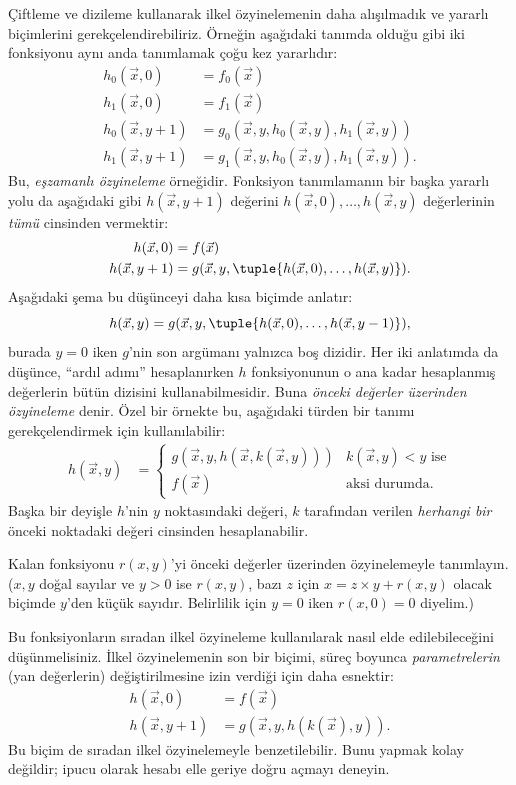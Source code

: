 \documentclass[../../../include/open-logic-section]{subfiles}
\begin{document}

Çiftleme ve dizileme kullanarak ilkel özyinelemenin daha alışılmadık ve
yararlı biçimlerini gerekçelendirebiliriz. Örneğin aşağıdaki tanımda olduğu
gibi iki fonksiyonu aynı anda tanımlamak çoğu kez yararlıdır:
\begin{align*}
  h_0(\vec x,0) & = f_0(\vec x)\\
  h_1(\vec x,0) & = f_1(\vec x)\\
  h_0(\vec x,y+1) & =
    g_0(\vec x,y,h_0(\vec x,y),h_1(\vec x,y))\\
  h_1(\vec x,y+1) & =
    g_1(\vec x,y,h_0(\vec x,y),h_1(\vec x,y)).
\end{align*}
Bu, \emph{eşzamanlı özyineleme} örneğidir. Fonksiyon tanımlamanın bir başka
yararlı yolu da aşağıdaki gibi $h(\vec x,y+1)$ değerini
$h(\vec x,0),\dots,h(\vec x,y)$ değerlerinin \emph{tümü} cinsinden vermektir:
\begin{align*}
  h(\vec x,0) & = f(\vec x)\\
  h(\vec x,y+1) & =
    g(\vec x,y,\tuple{h(\vec x,0),\dots,h(\vec x,y)}).
\end{align*}
Aşağıdaki şema bu düşünceyi daha kısa biçimde anlatır:
\[
  h(\vec x,y)=
  g(\vec x,y,\tuple{h(\vec x,0),\dots,h(\vec x,y-1)}),
\]
burada $y=0$ iken $g$'nin son argümanı yalnızca boş dizidir. Her iki
anlatımda da düşünce, ``ardıl adımı'' hesaplanırken $h$ fonksiyonunun o ana
kadar hesaplanmış değerlerin bütün dizisini kullanabilmesidir. Buna
\emph{önceki değerler üzerinden özyineleme} denir. Özel bir örnekte bu,
aşağıdaki türden bir tanımı gerekçelendirmek için kullanılabilir:
\begin{align*}
  h(\vec x,y) & = \begin{cases}
    g(\vec x,y,h(\vec x,k(\vec x,y))) & \text{$k(\vec x,y)<y$ ise}\\
    f(\vec x) & \text{aksi durumda.}
  \end{cases}
\end{align*}
Başka bir deyişle $h$'nin $y$ noktasındaki değeri, $k$ tarafından verilen
\emph{herhangi bir} önceki noktadaki değeri cinsinden hesaplanabilir.

\begin{prob}
  Kalan fonksiyonu $r(x,y)$'yi önceki değerler üzerinden özyinelemeyle
  tanımlayın. ($x,y$ doğal sayılar ve $y>0$ ise $r(x,y)$, bazı $z$ için
  $x=z\times y+r(x,y)$ olacak biçimde $y$'den küçük sayıdır. Belirlilik için
  $y=0$ iken $r(x,0)=0$ diyelim.)
\end{prob}

Bu fonksiyonların sıradan ilkel özyineleme kullanılarak nasıl elde
edilebileceğini düşünmelisiniz. İlkel özyinelemenin son bir biçimi, süreç
boyunca \emph{parametrelerin} (yan değerlerin) değiştirilmesine izin verdiği
için daha esnektir:
\begin{align*}
  h(\vec x,0) & = f(\vec x)\\
  h(\vec x,y+1) & = g(\vec x,y,h(k(\vec x),y)).
\end{align*}
Bu biçim de sıradan ilkel özyinelemeyle benzetilebilir. Bunu yapmak kolay
değildir; ipucu olarak hesabı elle geriye doğru açmayı deneyin.
\end{document}
